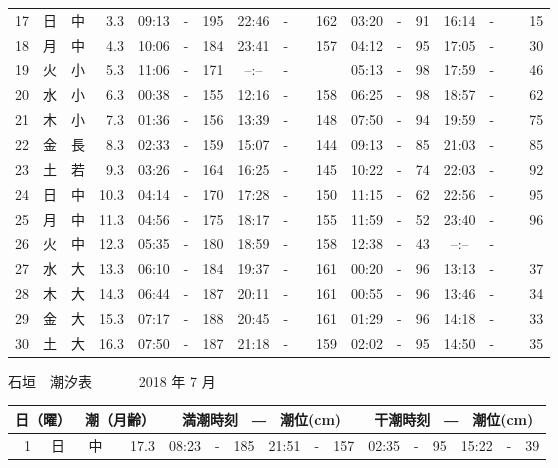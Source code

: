 \documentclass[12pt.a4j]{jsarticle}
\begin{document}
\begin{center}
\begin{table}[ht]
\begin{tabular}{|rc|cr|ccrccr|ccrccr|}
17 & 日 & 中 &  3.3 &  09:13 &-& 195  &  22:46 &-& 162  &   03:20 &-&  91  &   16:14 &-&  15  \\
18 & 月 & 中 &  4.3 &  10:06 &-& 184  &  23:41 &-& 157  &   04:12 &-&  95  &   17:05 &-&  30  \\
19 & 火 & 小 &  5.3 &  11:06 &-& 171  &  --:-- &-&~~~~~ &   05:13 &-&  98  &   17:59 &-&  46  \\
20 & 水 & 小 &  6.3 &  00:38 &-& 155  &  12:16 &-& 158  &   06:25 &-&  98  &   18:57 &-&  62  \\
21 & 木 & 小 &  7.3 &  01:36 &-& 156  &  13:39 &-& 148  &   07:50 &-&  94  &   19:59 &-&  75  \\
22 & 金 & 長 &  8.3 &  02:33 &-& 159  &  15:07 &-& 144  &   09:13 &-&  85  &   21:03 &-&  85  \\
23 & 土 & 若 &  9.3 &  03:26 &-& 164  &  16:25 &-& 145  &   10:22 &-&  74  &   22:03 &-&  92  \\
24 & 日 & 中 & 10.3 &  04:14 &-& 170  &  17:28 &-& 150  &   11:15 &-&  62  &   22:56 &-&  95  \\
25 & 月 & 中 & 11.3 &  04:56 &-& 175  &  18:17 &-& 155  &   11:59 &-&  52  &   23:40 &-&  96  \\
26 & 火 & 中 & 12.3 &  05:35 &-& 180  &  18:59 &-& 158  &   12:38 &-&  43  &   --:-- &-&~~~~~ \\
27 & 水 & 大 & 13.3 &  06:10 &-& 184  &  19:37 &-& 161  &   00:20 &-&  96  &   13:13 &-&  37  \\
28 & 木 & 大 & 14.3 &  06:44 &-& 187  &  20:11 &-& 161  &   00:55 &-&  96  &   13:46 &-&  34  \\
29 & 金 & 大 & 15.3 &  07:17 &-& 188  &  20:45 &-& 161  &   01:29 &-&  96  &   14:18 &-&  33  \\
30 & 土 & 大 & 16.3 &  07:50 &-& 187  &  21:18 &-& 159  &   02:02 &-&  95  &   14:50 &-&  35  \\
   \hline
   \end{tabular}
\end{table}
\newpage
 {\LARGE 石垣　潮汐表　　　}
 {\large 2018 年  7 月}\\
 \begin{table}[ht]
    \begin{tabular}{|rc|cr|ccrccr|ccrccr|}
    \hline
    \multicolumn{2}{|c|}{日（曜）} & \multicolumn{2}{c|}{潮（月齢）} & \multicolumn{6}{c|}{満潮時刻　―　潮位(cm)} & \multicolumn{6}{c|}{干潮時刻　―　潮位(cm)} \\
 \hline
 1 & 日 & 中 & 17.3 &  08:23 &-& 185  &  21:51 &-& 157  &   02:35 &-&  95  &   15:22 &-&  39  \\

\end{tabular}
\end{table}
\end{center}
\end{document}
